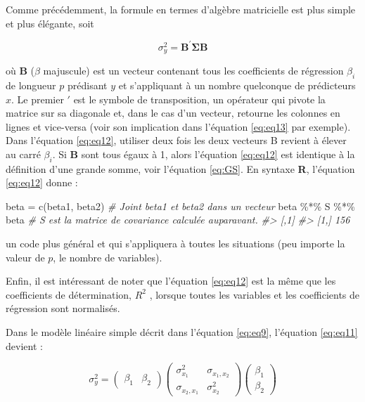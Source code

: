 \documentclass[
]{book}
\newenvironment{Shaded}{}{}
\newcommand{\CommentTok}[1]{\textit{#1}}
\newcommand{\FunctionTok}[1]{#1}
\newcommand{\NormalTok}[1]{#1}
\newcommand{\OtherTok}[1]{#1}
\newcommand{\SpecialCharTok}[1]{#1}
\begin{document}
Comme précédemment, la formule en termes d'algèbre matricielle est plus simple et plus élégante, soit

\begin{equation}
\sigma_y^2 = \mathbf{B}^{\prime} \mathbf{\Sigma} \mathbf{B}
\label{eq:eq12}
\end{equation}

où \(\mathbf{B}\) (\(\beta\) majuscule) est un vecteur contenant tous les coefficients de régression \(\beta_i\) de longueur \(p\) prédisant \(y\) et s'appliquant à un nombre quelconque de prédicteurs \(x\). Le premier \(\prime\) est le symbole de transposition, un opérateur qui pivote la matrice sur sa diagonale et, dans le cas d'un vecteur, retourne les colonnes en lignes et vice-versa (voir son implication dans l'équation \eqref{eq:eq13} par exemple). Dans l'équation \eqref{eq:eq12}, utiliser deux fois les deux vecteurs B revient à élever au carré \(\beta_i\). Si \(\mathbf{B}\) sont tous égaux à 1, alors l'équation \eqref{eq:eq12} est identique à la définition d'une grande somme, voir l'équation \eqref{eq:GS}. En syntaxe \textbf{R}, l'équation \eqref{eq:eq12} donne :

\begin{Shaded}
\begin{Highlighting}[]
\NormalTok{beta }\OtherTok{=} \FunctionTok{c}\NormalTok{(beta1, beta2) }\CommentTok{\# Joint beta1 et beta2 dans un vecteur}
\NormalTok{beta }\SpecialCharTok{\%*\%}\NormalTok{ S }\SpecialCharTok{\%*\%}\NormalTok{ beta }\CommentTok{\# S est la matrice de covariance calculée auparavant.}
\CommentTok{\#\textgreater{}      [,1]}
\CommentTok{\#\textgreater{} [1,]  156}
\end{Highlighting}
\end{Shaded}

un code plus général et qui s'appliquera à toutes les situations (peu importe la valeur de \(p\), le nombre de variables).

Enfin, il est intéressant de noter que l'équation \eqref{eq:eq12} est la même que les coefficients de détermination, \(R^2\) \autocite{Cohen03}, lorsque toutes les variables et les coefficients de régression sont normalisés.

Dans le modèle linéaire simple décrit dans l'équation \eqref{eq:eq9}, l'équation \eqref{eq:eq11} devient :

\begin{equation}
\sigma_y^2 = 
\left(\begin{array}{cc} 
\beta_1 & \beta_2 
\end{array}\right) 
\left( \begin{array}{cc}
\sigma^2_{x_1} & \sigma_{x_1,x_2} \\
\sigma_{x_2,x_1} & \sigma^2_{x_2} 
\end{array} 
\right)
\left(\begin{array}{c} \beta_1 \\ \beta_2 \end{array} \right)
\label{eq:eq13}
\end{equation}
\end{document}
